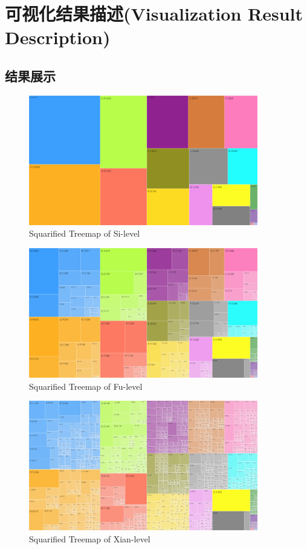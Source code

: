 \documentclass[11pt]{article}
\begin{document}
	\section{可视化结果描述(Visualization Result Description)}
	\subsection{结果展示}
	\begin{figure}[H]
		\centering
		\includegraphics[width=10cm]{./figures/si_squarified_treemap.png}
		\caption{Squarified Treemap of Si-level}
	\end{figure}
	\begin{figure}[H]
		\centering
		\includegraphics[width=10cm]{./figures/fu_squarified_treemap.png}
		\caption{Squarified Treemap of Fu-level}
	\end{figure}
	\begin{figure}[H]
		\centering
		\includegraphics[width=10cm]{./figures/xian_squarified_treemap.png}
		\caption{Squarified Treemap of Xian-level}
	\end{figure}
\end{document}
